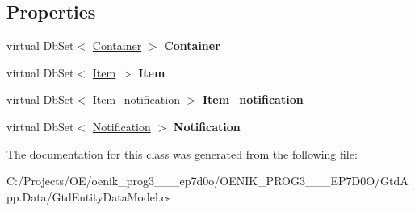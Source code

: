 \subsection*{Properties}
\begin{DoxyCompactItemize}
\item 
\mbox{\label{class_gtd_app_1_1_data_1_1_gtd_entity_data_model_a641256f630f42908cff207e277f823ec}} 
virtual Db\+Set$<$ \mbox{\hyperlink{class_gtd_app_1_1_data_1_1_container}{Container}} $>$ {\bfseries Container}
\item 
\mbox{\label{class_gtd_app_1_1_data_1_1_gtd_entity_data_model_a0f86eefb8da656d296b2df21b99a51c6}} 
virtual Db\+Set$<$ \mbox{\hyperlink{class_gtd_app_1_1_data_1_1_item}{Item}} $>$ {\bfseries Item}
\item 
\mbox{\label{class_gtd_app_1_1_data_1_1_gtd_entity_data_model_adfb7d21c062e4c7d8de115b9e649277b}} 
virtual Db\+Set$<$ \mbox{\hyperlink{class_gtd_app_1_1_data_1_1_item__notification}{Item\+\_\+notification}} $>$ {\bfseries Item\+\_\+notification}
\item 
\mbox{\label{class_gtd_app_1_1_data_1_1_gtd_entity_data_model_ae15929d92f723e2d23ca6959d2e1c1d6}} 
virtual Db\+Set$<$ \mbox{\hyperlink{class_gtd_app_1_1_data_1_1_notification}{Notification}} $>$ {\bfseries Notification}
\end{DoxyCompactItemize}


The documentation for this class was generated from the following file\+:\begin{DoxyCompactItemize}
\item 
C\+:/\+Projects/\+O\+E/oenik\+\_\+prog3\+\_\+\_\+\_\+ep7d0o/\+O\+E\+N\+I\+K\+\_\+\+P\+R\+O\+G3\+\_\+\_\+\_\+\+E\+P7\+D0\+O/\+Gtd\+App.\+Data/Gtd\+Entity\+Data\+Model.\+cs\end{DoxyCompactItemize}
